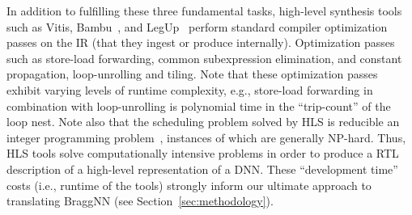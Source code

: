 In addition to fulfilling these three fundamental tasks, high-level synthesis tools such as Vitis, Bambu~\cite{ferrandi2021bambu}, and LegUp~\cite{10.1145/2514740} perform standard compiler optimization passes on the IR (that they ingest or produce internally).
Optimization passes such as store-load forwarding, common subexpression elimination, and constant propagation, loop-unrolling and tiling.
Note that these optimization passes exhibit varying levels of runtime complexity, e.g., store-load forwarding in combination with loop-unrolling is polynomial time in the ``trip-count'' of the loop nest.
Note also that the scheduling problem solved by HLS is reducible an integer programming problem~\cite{tuprints9272}, instances of which are generally NP-hard.
Thus, HLS tools solve computationally intensive problems in order to produce a RTL description of a high-level representation of a DNN.
These ``development time'' costs (i.e., runtime of the tools) strongly inform our ultimate approach to translating BraggNN (see Section~\ref{sec:methodology}). 


